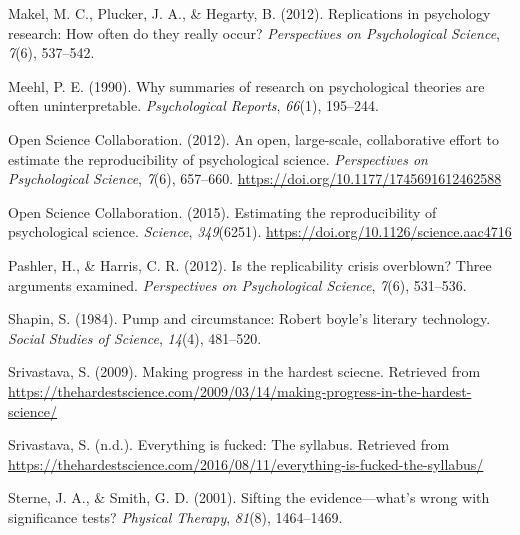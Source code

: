 \documentclass[man]{apa6}
\theoremstyle{definition}
\theoremstyle{definition}
\theoremstyle{definition}
\theoremstyle{remark}
\begin{document}
\leavevmode\hypertarget{ref-makel2012replications}{}%
Makel, M. C., Plucker, J. A., \& Hegarty, B. (2012). Replications in
psychology research: How often do they really occur? \emph{Perspectives
on Psychological Science}, \emph{7}(6), 537--542.

\leavevmode\hypertarget{ref-meehl1990summaries}{}%
Meehl, P. E. (1990). Why summaries of research on psychological theories
are often uninterpretable. \emph{Psychological Reports}, \emph{66}(1),
195--244.

\leavevmode\hypertarget{ref-open2012open}{}%
Open Science Collaboration. (2012). An open, large-scale, collaborative
effort to estimate the reproducibility of psychological science.
\emph{Perspectives on Psychological Science}, \emph{7}(6), 657--660.
\url{https://doi.org/10.1177/1745691612462588}

\leavevmode\hypertarget{ref-open2015estimating}{}%
Open Science Collaboration. (2015). Estimating the reproducibility of
psychological science. \emph{Science}, \emph{349}(6251).
\url{https://doi.org/10.1126/science.aac4716}

\leavevmode\hypertarget{ref-pashler2012replicability}{}%
Pashler, H., \& Harris, C. R. (2012). Is the replicability crisis
overblown? Three arguments examined. \emph{Perspectives on Psychological
Science}, \emph{7}(6), 531--536.

\leavevmode\hypertarget{ref-shapin1984pump}{}%
Shapin, S. (1984). Pump and circumstance: Robert boyle's literary
technology. \emph{Social Studies of Science}, \emph{14}(4), 481--520.

\leavevmode\hypertarget{ref-srivastava2009making}{}%
Srivastava, S. (2009). Making progress in the hardest sciecne. Retrieved
from
\url{https://thehardestscience.com/2009/03/14/making-progress-in-the-hardest-science/}

\leavevmode\hypertarget{ref-srivastava2018everything}{}%
Srivastava, S. (n.d.). Everything is fucked: The syllabus. Retrieved
from
\url{https://thehardestscience.com/2016/08/11/everything-is-fucked-the-syllabus/}

\leavevmode\hypertarget{ref-sterne2001sifting}{}%
Sterne, J. A., \& Smith, G. D. (2001). Sifting the evidence---what's
wrong with significance tests? \emph{Physical Therapy}, \emph{81}(8),
1464--1469.

\endgroup
\end{document}
